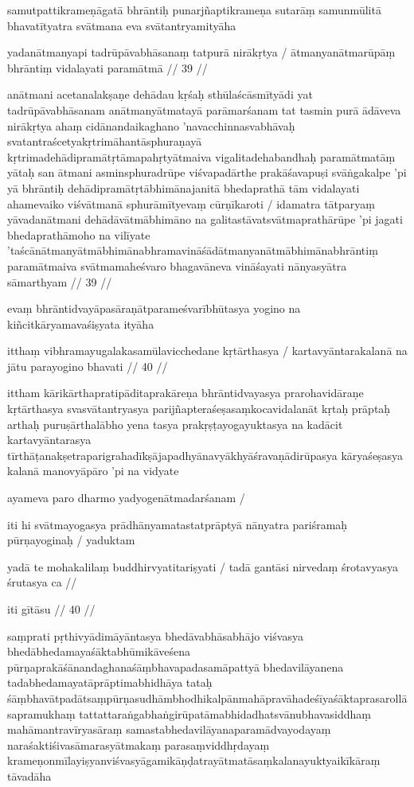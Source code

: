 samutpattikrameṇāgatā bhrāntiḥ punarjñaptikrameṇa sutarāṃ samunmūlitā bhavatītyatra svātmana eva svātantryamityāha

yadanātmanyapi tadrūpāvabhāsanaṃ tatpurā nirākṛtya  /
ātmanyanātmarūpāṃ bhrāntiṃ vidalayati paramātmā  // 39  //

anātmani acetanalakṣaṇe dehādau kṛśaḥ sthūlaścāsmītyādi yat tadrūpāvabhāsanam anātmanyātmatayā parāmarśanam tat tasmin purā ādāveva nirākṛtya ahaṃ cidānandaikaghano 'navacchinnasvabhāvaḥ svatantraścetyakṛtrimāhantāsphuraṇayā kṛtrimadehādipramātṛtāmapahṛtyātmaiva vigalitadehabandhaḥ paramātmatāṃ yātaḥ san ātmani asminsphuradrūpe viśvapadārthe prakāśavapuṣi svāṅgakalpe 'pi yā bhrāntiḥ dehādipramātṛtābhimānajanitā bhedaprathā tām vidalayati ahamevaiko viśvātmanā sphurāmītyevaṃ cūrṇīkaroti  / idamatra tātparyaṃ yāvadanātmani dehādāvātmābhimāno na galitastāvatsvātmaprathārūpe 'pi jagati bhedaprathāmoho na vilīyate 'taścānātmanyātmābhimānabhramavināśādātmanyanātmābhimānabhrāntiṃ paramātmaiva svātmamaheśvaro bhagavāneva vināśayati nānyasyātra sāmarthyam  // 39  //

evaṃ bhrāntidvayāpasāraṇātparameśvarībhūtasya yogino na kiñcitkāryamavaśiṣyata ityāha

itthaṃ vibhramayugalakasamūlavicchedane kṛtārthasya  /
kartavyāntarakalanā na jātu parayogino bhavati  // 40  //

ittham kārikārthapratipāditaprakāreṇa bhrāntidvayasya prarohavidāraṇe kṛtārthasya svasvātantryasya parijñapteraśeṣasaṃkocavidalanāt kṛtaḥ prāptaḥ arthaḥ puruṣārthalābho yena tasya prakṛṣṭayogayuktasya na kadācit kartavyāntarasya tīrthāṭanakṣetraparigrahadīkṣājapadhyānavyākhyāśravaṇādirūpasya kāryaśeṣasya kalanā manovyāpāro 'pi na vidyate

ayameva paro dharmo yadyogenātmadarśanam  /

iti hi svātmayogasya prādhānyamatastatprāptyā nānyatra pariśramaḥ pūrṇayoginaḥ  / yaduktam

yadā te mohakalilaṃ buddhirvyatitariṣyati  /
tadā gantāsi nirvedaṃ śrotavyasya śrutasya ca  //

iti gītāsu  // 40  //

saṃprati pṛthivyādimāyāntasya bhedāvabhāsabhājo viśvasya bhedābhedamayaśāktabhūmikāveśena pūrṇaprakāśānandaghanaśāṃbhavapadasamāpattyā bhedavilāyanena tadabhedamayatāprāptimabhidhāya tataḥ śāṃbhavātpadātsaṃpūrṇasudhāmbhodhikalpānmahāpravāhadeśīyaśāktaprasarollāsapramukhaṃ tattattaraṅgabhaṅgirūpatāmabhidadhatsvānubhavasiddhaṃ mahāmantravīryasāraṃ samastabhedavilāyanaparamādvayodayaṃ naraśaktiśivasāmarasyātmakaṃ parasaṃviddhṛdayaṃ krameṇonmīlayiṣyanviśvasyāgamikāṇḍatrayātmatāsaṃkalanayuktyaikīkāraṃ tāvadāha

